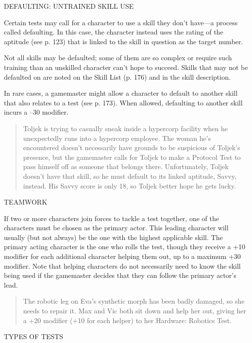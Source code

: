 DEFAULTING: UNTRAINED SKILL USE

Certain tests may call for a character to use a skill they
don't have—a process called defaulting. In this case,
the character instead uses the rating of the aptitude
(see p. 123) that is linked to the skill in question as the
target number.

Not all skills may be defaulted; some of them are
so complex or require such training than an unskilled
character can't hope to succeed. Skills that may not be
defaulted on are noted on the Skill List (p. 176) and in
the skill description.

In rare cases, a gamemaster might allow a character
to default to another skill that also relates to a test
(see p. 173). When allowed, defaulting to another skill
incurs a –30 modifier.

\begin{quotation}
  Toljek is trying to casually sneak inside a hypercorp facility when
  he unexpectedly runs into a hypercorp employee. The woman he's
  encountered doesn't necessarily have grounds to be suspicious of
  Toljek's presence, but the gamemaster calls for Toljek to make a
  Protocol Test to pass himself off as someone that belongs
  there. Unfortunately, Toljek doesn't have that skill, so he must
  default to its linked aptitude, Savvy, instead. His Savvy score is
  only 18, so Toljek better hope he gets lucky.
\end{quotation}

TEAMWORK

If two or more characters join forces to tackle a test
together, one of the characters must be chosen as the
primary actor. This leading character will usually (but
not always) be the one with the highest applicable
skill. The primary acting character is the one who
rolls the test, though they receive a +10 modifier for
each additional character helping them out, up to a
maximum +30 modifier. Note that helping characters
do not necessarily need to know the skill being used
if the gamemaster decides that they can follow the
primary actor's lead.

\begin{quotation}
  The robotic leg on Eva's synthetic morph has been badly damaged, so
  she needs to repair it. Max and Vic both sit down and help her out,
  giving her a +20 modifier (+10 for each helper) to her Hardware:
  Robotics Test.
\end{quotation}

TYPES OF TESTS

